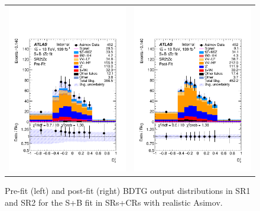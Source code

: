 \begin{figure}[htbp]
\begin{tabular}{cc}
		\includegraphics[width=.45\textwidth]{Chapters/CH8/figures/SPLUSB_CRSR_UsingDL1rcFullSys/Plots/SR2} &
		\includegraphics[width=.45\textwidth]{Chapters/CH8/figures/SPLUSB_CRSR_UsingDL1rcFullSys/Plots/SR2_postFit} \\
	\end{tabular}
	\caption{Pre-fit (left) and post-fit (right) BDTG output distributions in SR1 and SR2 for the S+B \tZc fit in SRs+CRs with realistic Asimov.
		\ErrStatSys
	}%
	\label{fig:stat:tzc:splusb:crsr:srplots:1}
\end{figure}

